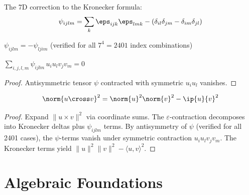 \begin{definition}\label{def:psi}
    \leanok
    The 7D correction to the Kronecker formula:
    \[
        \psi_{ijlm} = \sum_k \eps_{ijk}\eps_{lmk} - (\delta_{il}\delta_{jm} - \delta_{im}\delta_{jl})
    \]
\end{definition}

\begin{lemma}\label{lem:psi_antisym_il}
    \leanok
    $\psi_{ijlm} = -\psi_{ljim}$
    (verified for all $7^4 = 2401$ index combinations)
\end{lemma}

\begin{lemma}\label{lem:psi_contract_vanishes}
    \leanok
    $\displaystyle\sum_{i,j,l,m} \psi_{ijlm} \, u_i u_l v_j v_m = 0$
\end{lemma}
\begin{proof}
    Antisymmetric tensor $\psi$ contracted with symmetric $u_i u_l$ vanishes.
\end{proof}

\begin{theorem}\label{thm:G2_cross_norm}
    \leanok
    \[
        \norm{u \cross v}^2 = \norm{u}^2 \norm{v}^2 - \ip{u}{v}^2
    \]
\end{theorem}
\begin{proof}
    Expand $\|u \times v\|^2$ via coordinate sums. The $\varepsilon$-contraction
    decomposes into Kronecker deltas plus $\psi_{ijlm}$ terms. By antisymmetry
    of $\psi$ (verified for all 2401 cases), the $\psi$-terms vanish under
    symmetric contraction $u_i u_l v_j v_m$. The Kronecker terms yield
    $\|u\|^2 \|v\|^2 - \langle u,v \rangle^2$.
\end{proof}

\chapter{Algebraic Foundations}\label{chap:algebraic}

